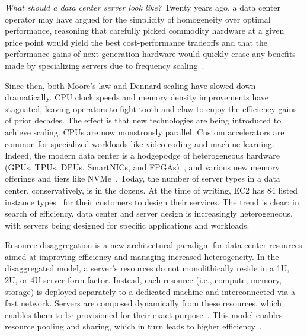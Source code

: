 \documentclass[12pt]{ucsddissertation}
\begin{document}
\begin{dissertationintroduction}


\textit{What should a data center server look like?} Twenty years ago, a data center operator may
have argued for the simplicity of homogeneity over optimal performance, reasoning that carefully
picked commodity hardware at a given price point would yield the best cost-performance tradeoffs and that the
performance gains of next-generation hardware would quickly erase any benefits made by specializing
servers due to frequency scaling~\cite{moore}.

Since then, both Moore's law and Dennard scaling have slowed down dramatically. CPU clock speeds and
memory density improvements have stagnated, leaving operators to fight tooth and claw to enjoy the
efficiency gains of prior decades. The effect is that new technologies are being introduced to
achieve scaling. CPUs are now monstrously parallel. Custom accelerators are common for specialized
workloads like video coding and machine learning. Indeed, the modern data center is a hodgepodge of
heterogeneous hardware (GPUs, TPUs, DPUs, SmartNICs, and
FPGAs)~\cite{dsnf,azure-smartnic,tpu,nitro}, and various new memory offerings and tiers like
NVMe~\cite{decible}. Today, the number of server types in a data center, conservatively, is in the
dozens. At the time of writing, EC2 has 84 listed instance types~\cite{ec2-offer} for their
customers to design their services. The trend is clear: in search of efficiency, data center and
server design is increasingly heterogeneous, with servers being designed for specific applications
and workloads.

Resource disaggregation is a new architectural paradigm for data center resources aimed at improving
efficiency and managing increased heterogeneity. In the disaggregated model, a server's resources do
not monolithically reside in a 1U, 2U, or 4U server form factor. Instead, each resource (i.e.,
compute, memory, storage) is deployed separately to a dedicated machine and interconnected via a
fast network. Servers are composed dynamically from these resources, which enables them to be
provisioned for their exact purpose~\cite{disandapp,infiniswap,blade-server,decible,legoos}. This
model enables resource pooling and sharing, which in turn leads to higher
efficiency~\cite{regions,fastswap,dsnf,aifm,supernic,ditto}.




\end{dissertationintroduction}
\end{document}
